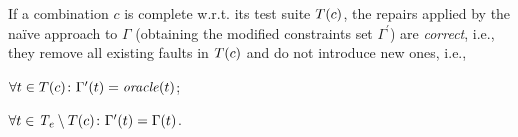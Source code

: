 \begin{tikzborder}{\cite{Gargantini16:validation}}
\begin{tikzborder}{\cite{gargantini_combinatorial_2017}}
\begin{tikzborder}{\cite{garn2019}}
\begin{tikzborder}{\cite{arcaini2019achieving}}
\begin{tikzborder}{\cite{arcaini2019varivolution}}
		
		\begin{thm}\label{thm:correctnessNaive}
			If a combination $c$ is complete w.r.t. its test suite $T(c)$, the repairs applied by the na{\"i}ve approach to $\Gamma$ (obtaining the modified constraints set $\Gamma ^\prime$) are {\it correct}, i.e., they remove all existing faults in $T(c)$ and do not introduce new ones, i.e.,
			\begin{compactenum}
				\item $\forall t \in T(c) \colon \Gamma^\prime(t) = \mathit{oracle}(t)$;
				\item $\forall t \in \mathit{T_e} \setminus T(c) \colon \Gamma^\prime(t) = \Gamma(t)$.
			\end{compactenum}
		\end{thm}
		

\end{tikzborder}
\end{tikzborder}
\end{tikzborder}
\end{tikzborder}
\end{tikzborder}
